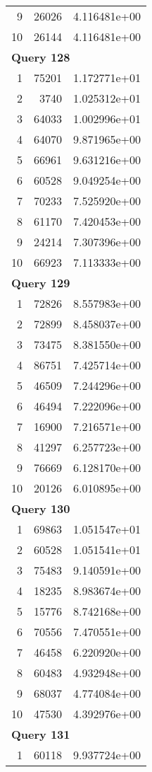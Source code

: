 \begin{longtable}[{p}]{@{}rrp{}@{}}
9 & 26026 & 4.116481e+00 \\
10 & 26144 & 4.116481e+00 \\
\midrule
\multicolumn{3}{l}{\bfseries Query 128} \\
1 & 75201 & 1.172771e+01 \\
2 & 3740 & 1.025312e+01 \\
3 & 64033 & 1.002996e+01 \\
4 & 64070 & 9.871965e+00 \\
5 & 66961 & 9.631216e+00 \\
6 & 60528 & 9.049254e+00 \\
7 & 70233 & 7.525920e+00 \\
8 & 61170 & 7.420453e+00 \\
9 & 24214 & 7.307396e+00 \\
10 & 66923 & 7.113333e+00 \\
\midrule
\multicolumn{3}{l}{\bfseries Query 129} \\
1 & 72826 & 8.557983e+00 \\
2 & 72899 & 8.458037e+00 \\
3 & 73475 & 8.381550e+00 \\
4 & 86751 & 7.425714e+00 \\
5 & 46509 & 7.244296e+00 \\
6 & 46494 & 7.222096e+00 \\
7 & 16900 & 7.216571e+00 \\
8 & 41297 & 6.257723e+00 \\
9 & 76669 & 6.128170e+00 \\
10 & 20126 & 6.010895e+00 \\
\midrule
\multicolumn{3}{l}{\bfseries Query 130} \\
1 & 69863 & 1.051547e+01 \\
2 & 60528 & 1.051541e+01 \\
3 & 75483 & 9.140591e+00 \\
4 & 18235 & 8.983674e+00 \\
5 & 15776 & 8.742168e+00 \\
6 & 70556 & 7.470551e+00 \\
7 & 46458 & 6.220920e+00 \\
8 & 60483 & 4.932948e+00 \\
9 & 68037 & 4.774084e+00 \\
10 & 47530 & 4.392976e+00 \\
\midrule
\multicolumn{3}{l}{\bfseries Query 131} \\
1 & 60118 & 9.937724e+00 \\

\end{longtable}
